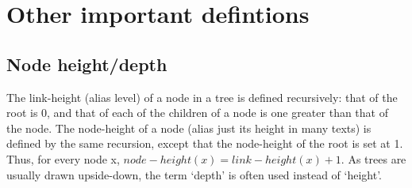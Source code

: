 \documentclass[twocolumn,a4paper]{article}
\begin{document}
\newpage
\section*{Other important defintions}
\subsection*{Node height/depth}
The link-height (alias level) of a node in a tree is defined recursively: that of the root is 0,
and that of each of the children of a node is one greater than that of the node.
The node-height of a node (alias just its height in many texts) is defined by the same recursion,
except that the node-height of the root is set at 1.
Thus, for every node x, \(node-height(x) = link-height(x) + 1\).
As trees are usually drawn upside-down, the term `depth' is often used instead of `height'.
\end{document}
